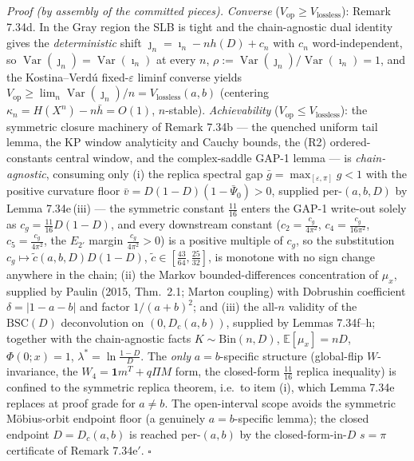 \documentclass[
]{article}
\begin{document}
\emph{Proof (by assembly of the committed pieces).} \emph{Converse}
($V_{\mathrm{op}}\ge V_{\mathrm{lossless}}$): Remark 7.34d. In the Gray region
the SLB is tight and the chain-agnostic dual identity gives the
\emph{deterministic} shift $\jmath_n=\imath_n-nh(D)+c_n$ with $c_n$
word-independent, so $\operatorname{Var}(\jmath_n)=\operatorname{Var}(\imath_n)$
at every $n$, $\rho:=\operatorname{Var}(\jmath_n)/\operatorname{Var}(\imath_n)=1$,
and the Kostina--Verd\'u fixed-$\varepsilon$ liminf converse yields
$V_{\mathrm{op}}\ge\lim_n\operatorname{Var}(\jmath_n)/n=V_{\mathrm{lossless}}(a,b)$
(centering $\kappa_n=H(X^n)-n\bar h=O(1)$, $n$-stable). \emph{Achievability}
($V_{\mathrm{op}}\le V_{\mathrm{lossless}}$): the symmetric closure machinery of
Remark 7.34b --- the quenched uniform tail lemma, the KP window analyticity and
Cauchy bounds, the (R2) ordered-constants central window, and the complex-saddle
GAP-1 lemma --- is \emph{chain-agnostic}, consuming only (i) the replica
spectral gap $\bar g=\max_{[\varepsilon,\pi]}g<1$ with the positive curvature
floor $\bar v=D(1-D)(1-\bar\Psi_0)>0$, supplied per-$(a,b,D)$ by
Lemma 7.34e\,(iii) --- the symmetric constant $\tfrac{11}{16}$ enters the
GAP-1 write-out solely as $c_g=\tfrac{11}{16}D(1-D)$, and every downstream
constant ($c_2=\tfrac{c_g}{4\pi^2}$, $c_4=\tfrac{c_g}{16\pi^2}$,
$c_5=\tfrac{c_g}{4\pi^2}$, the $E_{2'}$ margin $\tfrac{c_g}{4\pi^2}>0$) is a
positive multiple of $c_g$, so the substitution
$c_g\mapsto\tilde c(a,b,D)D(1-D)$, $\tilde c\in[\tfrac{43}{64},\tfrac{25}{32}]$,
is monotone with no sign change anywhere in the chain; (ii) the Markov
bounded-differences concentration of $\mu_x$, supplied by Paulin (2015,
Thm.~2.1; Marton coupling) with Dobrushin coefficient $\delta=|1-a-b|$ and
factor $1/(a+b)^2$; and (iii) the all-$n$ validity of the $\mathrm{BSC}(D)$
deconvolution on $(0,D_c(a,b))$, supplied by Lemmas 7.34f--h; together with the
chain-agnostic facts $K\sim\mathrm{Bin}(n,D)$, $\mathbb E[\mu_x]=nD$,
$\Phi(0;x)=1$, $\lambda^*=\ln\tfrac{1-D}D$. The \emph{only} $a=b$-specific
structure (global-flip $W$-invariance, the $W_4=\mathbf 1m^T+q\Pi M$ form, the
closed-form $\tfrac{11}{16}$ replica inequality) is confined to the symmetric
replica theorem, i.e.\ to item (i), which Lemma 7.34e replaces at proof grade
for $a\ne b$. The open-interval scope avoids the symmetric Möbius-orbit
endpoint floor (a genuinely $a=b$-specific lemma); the closed endpoint
$D=D_c(a,b)$ is reached per-$(a,b)$ by the closed-form-in-$D$ $s=\pi$ certificate
of Remark 7.34e$'$. \hfill$\square$
\end{document}
